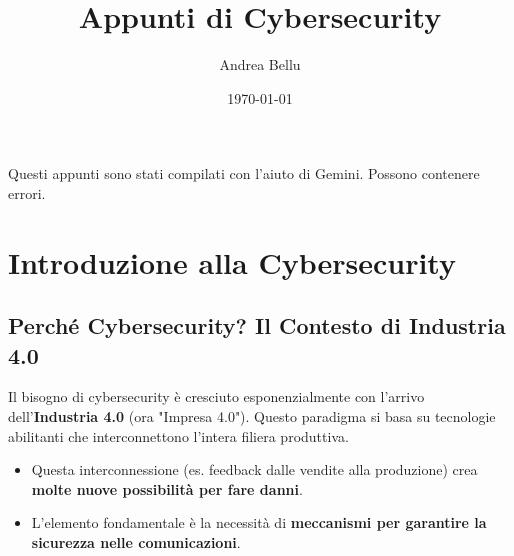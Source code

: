\documentclass[a4paper,12pt]{article}
\title{\vspace{-2em}\textbf{\Huge Appunti di Cybersecurity}\vspace{-0.5em}}
\author{\Large Andrea Bellu}
\date{\today}
\begin{document}
\noindent
\maketitle

{\scriptsize Questi appunti sono stati compilati con l'aiuto di Gemini. Possono contenere errori.}

\tableofcontents
\newpage

\section{Introduzione alla Cybersecurity}

\subsection{Perché Cybersecurity? Il Contesto di Industria 4.0}
Il bisogno di cybersecurity è cresciuto esponenzialmente con l'arrivo dell'\textbf{Industria 4.0} (ora "Impresa 4.0"). Questo paradigma si basa su tecnologie abilitanti che interconnettono l'intera filiera produttiva.
\begin{itemize}
    \item Questa interconnessione (es. feedback dalle vendite alla produzione) crea \textbf{molte nuove possibilità per fare danni}.
    \item L'elemento fondamentale è la necessità di \textbf{meccanismi per garantire la sicurezza nelle comunicazioni}.
\end{itemize}
\end{document}
